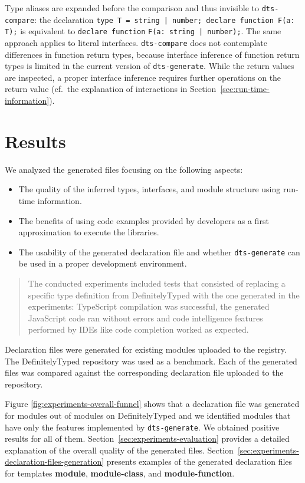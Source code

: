 \documentclass[sigplan,screen]{acmart}
\newcommand{\secref}[1]{Section~\ref{#1}}
\begin{document}
Type aliases are expanded before the comparison and thus invisible to
\texttt{dts-compare}: the declaration
\lstinline{type T = string | number; declare function F(a: T);} is equivalent to
\lstinline{declare function} \lstinline{F(a: string | number);}. The same approach applies to literal
interfaces. \texttt{dts-compare} does 
not contemplate differences in function return types, because interface inference of
function return types is limited in the current version of
\texttt{dts-generate}. While the return values are inspected, a proper
interface inference requires further operations on the return value
(cf.\ the explanation of interactions in \secref{sec:run-time-information}).

\section{Results}
\label{sec:results}
We analyzed the generated files focusing on the following aspects:
\begin{itemize}
  \item The quality of the inferred types, interfaces, and module structure using run-time information.
  \item The benefits of using code examples provided by developers as
    a first approximation to execute the libraries. %
  \item The usability of the generated declaration file and whether \texttt{dts-generate} can be used in a proper development environment.
\end{itemize}

\begin{quotation}
  The conducted experiments included tests that consisted of replacing
  a specific type definition from DefinitelyTyped
  \cite{definitely-typed-repository} with the one generated in the
  experiments: TypeScript compilation was successful, the generated
  JavaScript code ran without errors and code intelligence features
  performed by IDEs like code completion worked as expected.
\end{quotation}

Declaration files were generated for existing modules uploaded to the
\NPM{} registry. The DefinitelyTyped repository was used as a
benchmark. Each of the generated files was compared against the
corresponding declaration file uploaded to the repository.

Figure \ref{fig:experiments-overall-funnel} shows that a declaration file was generated
for \CountModulesGeneratedDeclarationFile{} modules out of
\CountTotalModulesDefinitelyTyped{} modules on DefinitelyTyped and we identified \CountModulesOnlySolvableDifferences{} modules that have only the
features implemented by \texttt{dts-generate}. We obtained positive results for all of
them. Section~\ref{sec:experiments-evaluation} provides a detailed explanation of the overall
quality of the generated files.
Section~\ref{sec:experiments-declaration-files-generation} presents examples of the generated declaration files for
templates \textbf{module}, \textbf{module-class}, and \textbf{module-function}.
\end{document}
